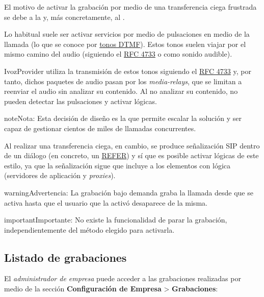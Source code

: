 \documentclass[letterpaper,10pt,spanish]{sphinxmanual}
\begin{document}
El motivo de activar la grabación por medio de una transferencia ciega frustrada se debe a la {\hyperref[architecture/index:architecture]{}} y, más concretamente, al {\hyperref[architecture/index:audioflow]{}}.

Lo habitual suele ser activar servicios por medio de pulsaciones en medio de la llamada (lo que se conoce por \href{https://es.wikipedia.org/wiki/Marcaci\%C3\%B3n\_por\_tonos}{tonos DTMF}). Estos tonos suelen viajar por el mismo camino del audio (siguiendo el \href{https://tools.ietf.org/html/rfc4733}{RFC 4733} o como sonido audible).

IvozProvider utiliza la transmisión de estos tonos siguiendo el \href{https://tools.ietf.org/html/rfc4733}{RFC 4733} y, por tanto, dichos paquetes de audio pasan por los \emph{media-relays}, que se limitan a reenviar el audio sin analizar su contenido. Al no analizar su contenido, no pueden detectar las pulsaciones y activar lógicas.

\begin{notice}{note}{Nota:}
Esta decisión de diseño es la que permite escalar la solución y ser capaz de gestionar cientos de miles de llamadas concurrentes.
\end{notice}

Al realizar una transferencia ciega, en cambio, se produce señalización SIP dentro de un diálogo (en concreto, un \href{https://tools.ietf.org/html/rfc3515}{REFER}) y sí que es posible activar lógicas de este estilo, ya que la señalización sigue  que incluye a los elementos con lógica (servidores de aplicación y \emph{proxies}).

\begin{notice}{warning}{Advertencia:}
La grabación bajo demanda graba la llamada desde que se activa hasta que el usuario que la activó desaparece de la misma.
\end{notice}

\begin{notice}{important}{Importante:}
No existe la funcionalidad de parar la grabación, independientemente del método elegido para activarla.
\end{notice}


\subsection{Listado de grabaciones}
\label{pbx_features/call_recording:listado-de-grabaciones}
El \emph{administrador de empresa} puede acceder a las grabaciones realizadas por medio de la sección \textbf{Configuración de Empresa} \textgreater{} \textbf{Grabaciones}:
\end{document}

